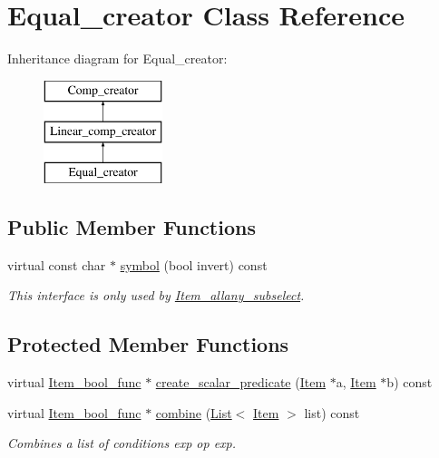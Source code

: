 \hypertarget{classEqual__creator}{}\section{Equal\+\_\+creator Class Reference}
\label{classEqual__creator}
Inheritance diagram for Equal\+\_\+creator\+:\begin{figure}[H]
\begin{center}
\leavevmode
\includegraphics[height=3.000000cm]{classEqual__creator}
\end{center}
\end{figure}
\subsection*{Public Member Functions}
\begin{DoxyCompactItemize}
\item 
\mbox{\label{classEqual__creator_acf0e5f43d08ace368fc1894ce46d32f3}} 
virtual const char $\ast$ \mbox{\hyperlink{classEqual__creator_acf0e5f43d08ace368fc1894ce46d32f3}{symbol}} (bool invert) const
\begin{DoxyCompactList}\small\item\em This interface is only used by \mbox{\hyperlink{classItem__allany__subselect}{Item\+\_\+allany\+\_\+subselect}}. \end{DoxyCompactList}\end{DoxyCompactItemize}
\subsection*{Protected Member Functions}
\begin{DoxyCompactItemize}
\item 
virtual \mbox{\hyperlink{classItem__bool__func}{Item\+\_\+bool\+\_\+func}} $\ast$ \mbox{\hyperlink{classEqual__creator_adce84c4bb7f90dd0aca3c2a0c4dd6f35}{create\+\_\+scalar\+\_\+predicate}} (\mbox{\hyperlink{classItem}{Item}} $\ast$a, \mbox{\hyperlink{classItem}{Item}} $\ast$b) const
\item 
\mbox{\label{classEqual__creator_a9e065db9a091018b7af0c00565fd2371}} 
virtual \mbox{\hyperlink{classItem__bool__func}{Item\+\_\+bool\+\_\+func}} $\ast$ \mbox{\hyperlink{classEqual__creator_a9e065db9a091018b7af0c00565fd2371}{combine}} (\mbox{\hyperlink{classList}{List}}$<$ \mbox{\hyperlink{classItem}{Item}} $>$ list) const
\begin{DoxyCompactList}\small\item\em Combines a list of conditions {\ttfamily exp op exp}. \end{DoxyCompactList}\end{DoxyCompactItemize}


